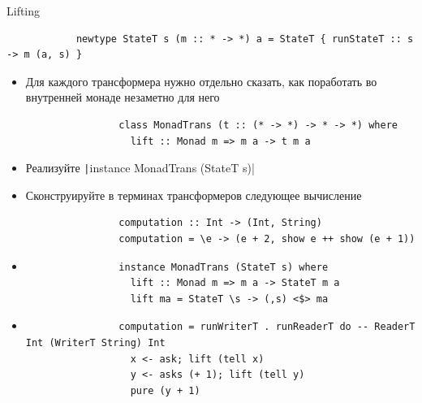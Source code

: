     \begin{frame}[fragile]{Lifting}
        \begin{verbatim}
            newtype StateT s (m :: * -> *) a = StateT { runStateT :: s -> m (a, s) }
        \end{verbatim}
        \begin{itemize}
            \item Для каждого трансформера нужно отдельно сказать, как поработать во внутренней монаде незаметно для него
            \begin{verbatim}
                class MonadTrans (t :: (* -> *) -> * -> *) where
                  lift :: Monad m => m a -> t m a
            \end{verbatim}
            \item[\todo] Реализуйте \texttt|instance MonadTrans (StateT s)|
            \item[\todo] Сконструируйте в терминах трансформеров следующее вычисление
            \begin{verbatim}
                computation :: Int -> (Int, String)
                computation = \e -> (e + 2, show e ++ show (e + 1))
            \end{verbatim}
            \item[\answer] \pause
            \begin{verbatim}
                instance MonadTrans (StateT s) where
                  lift :: Monad m => m a -> StateT m a
                  lift ma = StateT \s -> (,s) <$> ma
            \end{verbatim}
            \item[\answer] \pause
            \begin{verbatim}
                computation = runWriterT . runReaderT do -- ReaderT Int (WriterT String) Int
                  x <- ask; lift (tell x)
                  y <- asks (+ 1); lift (tell y)
                  pure (y + 1)
            \end{verbatim}
        \end{itemize}
    \end{frame}

